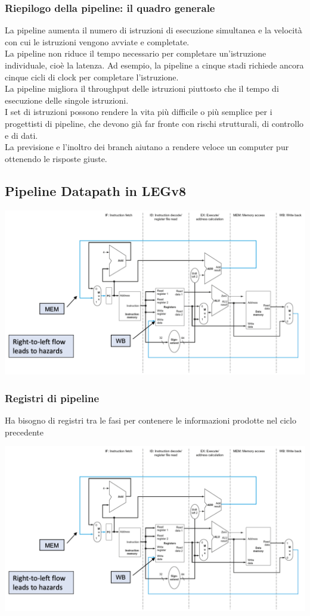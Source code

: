 \documentclass[12pt,a4paper]{article}
\begin{document}
\subsubsection{Riepilogo della pipeline: il quadro generale}
La pipeline aumenta il numero di istruzioni di esecuzione simultanea e la velocità con cui le istruzioni vengono avviate e completate.\\
La pipeline non riduce il tempo necessario per completare un'istruzione individuale, cioè la latenza. Ad esempio, la pipeline a cinque stadi richiede ancora cinque cicli di clock per completare l'istruzione.\\
La pipeline migliora il throughput delle istruzioni piuttosto che il tempo di esecuzione delle singole istruzioni.\\
I set di istruzioni possono rendere la vita più difficile o più semplice per i progettisti di pipeline, che devono già far fronte con rischi strutturali, di controllo e di dati.\\
La previsione e l'inoltro dei branch aiutano a rendere veloce un computer pur ottenendo le risposte giuste.

\subsection{Pipeline Datapath in LEGv8}
\begin{center}
\includegraphics[width=0.6\columnwidth]{img/pipeline_legv8.png}
\end{center}

\subsubsection{Registri di pipeline}
Ha bisogno di registri tra le fasi per contenere le informazioni prodotte nel ciclo precedente
\begin{center}
\includegraphics[width=0.6\columnwidth]{img/pipeline_legv8.png}
\end{center}
\end{document}
